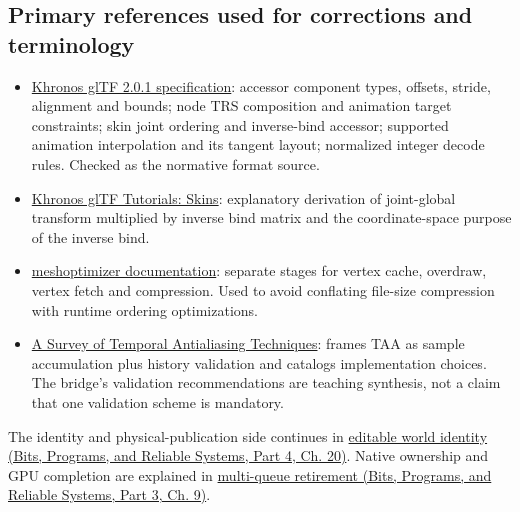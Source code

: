 \subsection{Primary references used for corrections and terminology}\label{04-visual-computing-ii-ch037-primary-references-used-for-corrections-and-terminology}

\hypertarget{04-visual-computing-ii-ch037-primary-references-used-for-corrections-and-terminology}{}

\begin{itemize}
\tightlist
\item
  \href{https://registry.khronos.org/glTF/specs/2.0/glTF-2.0.html}{Khronos glTF 2.0.1 specification}: accessor component types, offsets, stride, alignment and bounds; node TRS composition and animation target constraints; skin joint ordering and inverse-bind accessor; supported animation interpolation and its tangent layout; normalized integer decode rules. Checked as the normative format source.
\item
  \href{https://github.com/KhronosGroup/glTF-Tutorials/blob/main/gltfTutorial/gltfTutorial_020_Skins.md}{Khronos glTF Tutorials: Skins}: explanatory derivation of joint-global transform multiplied by inverse bind matrix and the coordinate-space purpose of the inverse bind.
\item
  \href{https://meshoptimizer.org/}{meshoptimizer documentation}: separate stages for vertex cache, overdraw, vertex fetch and compression. Used to avoid conflating file-size compression with runtime ordering optimizations.
\item
  \href{https://diglib.eg.org/items/cfa6a05c-53b3-4ee1-979d-48abc6225f6b}{A Survey of Temporal Antialiasing Techniques}: frames TAA as sample accumulation plus history validation and catalogs implementation choices. The bridge's validation recommendations are teaching synthesis, not a claim that one validation scheme is mandatory.
\end{itemize}

The identity and physical-publication side continues in \href{../01-Bits-Programs-and-Reliable-Systems-P04/main.pdf\#nameddest=06-engine-ii-ch042-rendering-identity-becomes-world-identity-only-through-an-explicit-bridge}{editable world identity (Bits, Programs, and Reliable Systems, Part 4, Ch. 20)}. Native ownership and GPU completion are explained in \href{../01-Bits-Programs-and-Reliable-Systems-P03/main.pdf\#nameddest=01-foundations-i-ch011-retire-a-resource-after-every-user-not-after-one-convenient-clock}{multi-queue retirement (Bits, Programs, and Reliable Systems, Part 3, Ch. 9)}.


